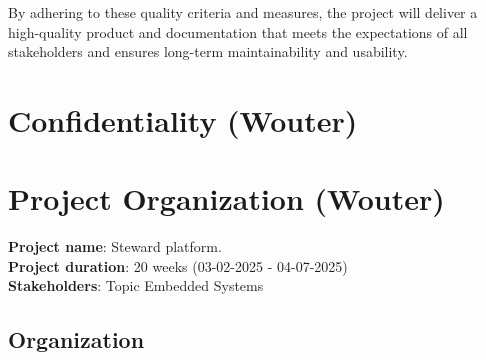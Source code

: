 \documentclass{article}
\begin{document}
By adhering to these quality criteria and measures, the project will deliver a high-quality product and documentation that meets the expectations of all stakeholders and ensures long-term maintainability and usability.

\newpage

\section{Confidentiality (Wouter)}


\newpage

\section{Project Organization (Wouter)}
\textbf{Project name}: Steward platform.\\
\textbf{Project duration}: 20 weeks (03-02-2025 - 04-07-2025)\\
\textbf{Stakeholders}: Topic Embedded Systems

\subsection{Organization}
\end{document}

